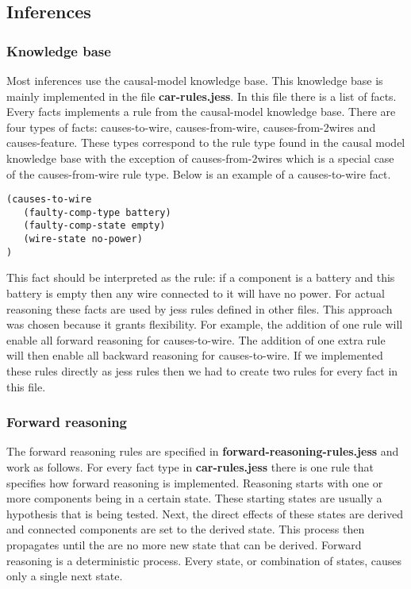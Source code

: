 \subsection{Inferences}
\subsubsection{Knowledge base}
Most inferences use the causal-model knowledge base. This knowledge base is mainly implemented in the file \textbf{car-rules.jess}. In this file there is a list of facts. Every facts implements a rule from the causal-model knowledge base. There are four types of facts: causes-to-wire, causes-from-wire, causes-from-2wires and causes-feature. These types correspond to the rule type found in the causal model knowledge base with the exception of causes-from-2wires which is a special case of the causes-from-wire rule type. Below is an example of a causes-to-wire fact.

\begin{verbatim}
(causes-to-wire
   (faulty-comp-type battery)
   (faulty-comp-state empty)
   (wire-state no-power)
)
\end{verbatim}

This fact should be interpreted as the rule: if a component is a battery and this battery is empty then any wire connected to it will have no power. For actual reasoning these facts are used by jess rules defined in other files. This approach was chosen because it grants flexibility. For example, the addition of one rule will enable all forward reasoning for causes-to-wire. The addition of one extra rule will then enable all backward reasoning for causes-to-wire. If we implemented these rules directly as jess rules then we had to create two rules for every fact in this file.

\subsubsection{Forward reasoning}
The forward reasoning rules are specified in \textbf{forward-reasoning-rules.jess} and work as follows. For every fact type in \textbf{car-rules.jess} there is one rule that specifies how forward reasoning is implemented. Reasoning starts with one or more components being in a certain state. These starting states are usually a hypothesis that is being tested. Next, the direct effects of these states are derived and connected components are set to the derived state. This process then propagates until the are no more new state that can be derived.	Forward reasoning is a deterministic process. Every state, or combination of states, causes only a single next state. 

